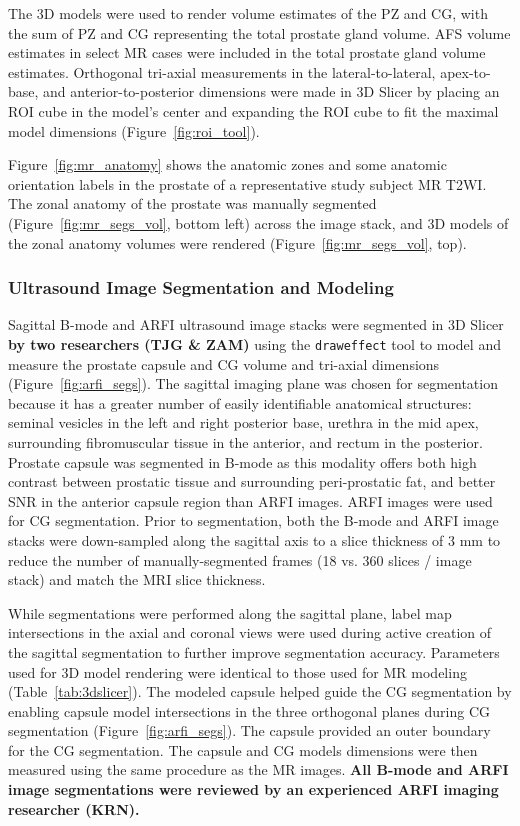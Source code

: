 The 3D models were used to render volume estimates of the PZ and CG, with the
sum of PZ and CG representing the total prostate gland volume. AFS volume
estimates in select MR cases were included in the total prostate gland volume
estimates. Orthogonal tri-axial measurements in the lateral-to-lateral,
apex-to-base, and anterior-to-posterior dimensions were made in 3D Slicer by
placing an ROI cube in the model's center and expanding the ROI cube to fit the
maximal model dimensions (Figure~\ref{fig:roi_tool}). 



Figure~\ref{fig:mr_anatomy} shows the anatomic zones and some anatomic
orientation labels in the prostate of a representative study subject MR T2WI.
The zonal anatomy of the prostate was manually segmented
(Figure~\ref{fig:mr_segs_vol}, bottom left) across the image stack, and 3D
models of the zonal anatomy volumes were rendered
(Figure~\ref{fig:mr_segs_vol}, top).



\subsubsection{Ultrasound Image Segmentation and Modeling}
Sagittal B-mode and ARFI ultrasound image stacks were segmented in 3D Slicer
\textbf{by two researchers (TJG \& ZAM)} using the \verb+draweffect+ tool to model and measure the prostate capsule and
CG volume and tri-axial dimensions (Figure~\ref{fig:arfi_segs}).  The sagittal
imaging plane was chosen for segmentation because it has a greater number of
easily identifiable anatomical structures:  seminal vesicles in the left and
right posterior base, urethra in the mid apex, surrounding fibromuscular tissue
in the anterior, and rectum in the posterior. Prostate capsule was segmented in
B-mode as this modality offers both high contrast between prostatic tissue and
surrounding peri-prostatic fat, and better SNR in the anterior capsule region
than ARFI images. ARFI images were used for CG segmentation.  Prior to
segmentation, both the B-mode and ARFI image stacks were down-sampled along the
sagittal axis to a slice thickness of 3 mm to reduce the number of
manually-segmented frames (18 vs. 360 slices / image stack) and match the MRI
slice thickness. 

While segmentations were performed along the sagittal plane, label map
intersections in the axial and coronal views were used during active creation
of the sagittal segmentation to further improve segmentation accuracy.
Parameters used for 3D model rendering were identical to those used for MR
modeling (Table~\ref{tab:3dslicer}).  The modeled capsule helped guide the CG
segmentation by enabling capsule model intersections in the three orthogonal
planes during CG segmentation (Figure~\ref{fig:arfi_segs}). The capsule
provided an outer boundary for the CG segmentation. The capsule and CG models
dimensions were then measured using the same procedure as the MR images.
\textbf{All B-mode and ARFI image segmentations were reviewed by an experienced
    ARFI imaging researcher (KRN).}



